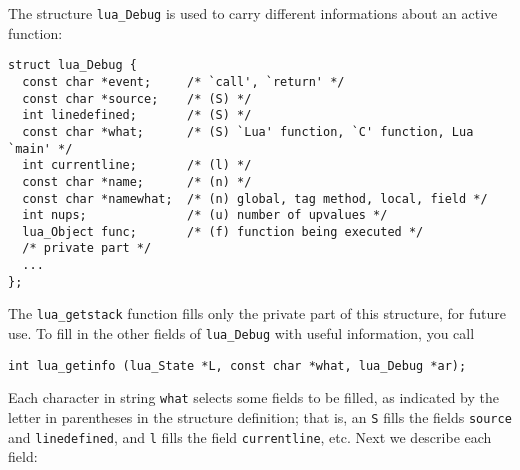 \documentclass[11pt]{article}
\newcommand{\Deffunc}[1]{\index{#1}}
\begin{document}
The structure \verb|lua_Debug| is used to carry different informations
about an active function: \Deffunc{lua_Debug}
\begin{verbatim}
struct lua_Debug {
  const char *event;     /* `call', `return' */
  const char *source;    /* (S) */
  int linedefined;       /* (S) */
  const char *what;      /* (S) `Lua' function, `C' function, Lua `main' */
  int currentline;       /* (l) */
  const char *name;      /* (n) */
  const char *namewhat;  /* (n) global, tag method, local, field */
  int nups;              /* (u) number of upvalues */
  lua_Object func;       /* (f) function being executed */
  /* private part */
  ...
};
\end{verbatim}
The \verb|lua_getstack| function fills only the private part
of this structure, for future use.
To fill in the other fields of \verb|lua_Debug| with useful information,
you call \Deffunc{lua_getinfo}
\begin{verbatim}
int lua_getinfo (lua_State *L, const char *what, lua_Debug *ar);
\end{verbatim}
Each character in string \verb|what| selects some fields to be filled,
as indicated by the letter in parentheses in the structure definition;
that is, an \verb|S| fills the fields \verb|source| and \verb|linedefined|,
and \verb|l| fills the field \verb|currentline|, etc.
Next we describe each field:
\end{document}
